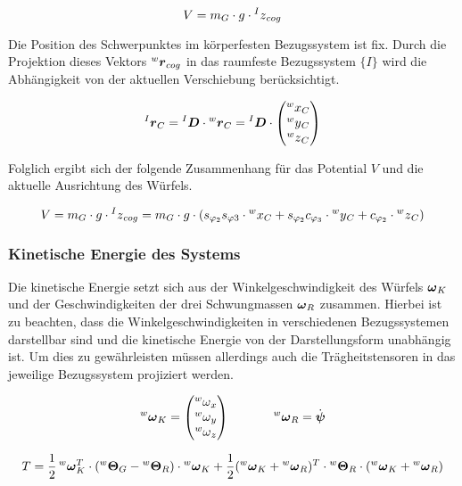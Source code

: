 \begin{equation}
V = m_G \cdot g \cdot \prescript{I}{} z_{cog}
\end{equation}

Die Position des Schwerpunktes im körperfesten Bezugssystem ist fix. Durch die Projektion dieses Vektors $\prescript{w}{}{}\boldsymbol{r}_{cog}$ in das raumfeste Bezugssystem $\{I\}$ wird die Abhängigkeit von der aktuellen Verschiebung berücksichtigt.

\begin{equation}
\prescript{I}{}{}\boldsymbol{r}_C = \prescript{I}{}{}\boldsymbol{D} \cdot \prescript{w}{}{}\boldsymbol{r}_{C} = \prescript{I}{}{}\boldsymbol{D} \cdot \begin{pmatrix}
\prescript{w}{} x_C \\ \prescript{w}{} y_C \\ \prescript{w}{} z_C
\end{pmatrix}
\end{equation}

Folglich ergibt sich der folgende Zusammenhang für das Potential $V$ und die aktuelle Ausrichtung des Würfels.

\begin{equation}
V = m_G \cdot g \cdot \prescript{I}{} z_{cog} = m_G \cdot g \cdot (s_{\varphi_2}s_{\varphi3} \cdot \prescript{w}{} x_C + s_{\varphi_2}c_{\varphi_3} \cdot \prescript{w}{} y_C  + c_{\varphi_2} \cdot \prescript{w}{} z_C)
\end{equation}

\subsubsection{Kinetische Energie des Systems}
Die kinetische Energie setzt sich aus der Winkelgeschwindigkeit des Würfels $\boldsymbol{\omega}_K$ und der Geschwindigkeiten der drei Schwungmassen $\boldsymbol{\omega}_R$ zusammen. Hierbei ist zu beachten, dass die Winkelgeschwindigkeiten in verschiedenen Bezugssystemen darstellbar sind und die kinetische Energie von der Darstellungsform unabhängig ist. Um dies zu gewährleisten müssen allerdings auch die Trägheitstensoren in das jeweilige Bezugssystem projiziert werden.

\begin{equation}
\prescript{w}{}{}\boldsymbol{\omega}_K = \begin{pmatrix}
\prescript{w}{} \omega_x \\
\prescript{w}{} \omega_y \\
\prescript{w}{} \omega_z
\end{pmatrix}
\hspace{35pt}
\prescript{w}{}{}\boldsymbol{\omega}_R = \dot{\boldsymbol{\psi}}
\end{equation}

\begin{equation}
T = \frac{1}{2} \prescript{w}{}{}\boldsymbol{\omega}^T_K \cdot (\prescript{w}{}{}\boldsymbol{\Theta}_G - \prescript{w}{}{}\boldsymbol{\Theta}_R) \cdot \prescript{w}{}{}\boldsymbol{\omega}_K + \frac{1}{2} (\prescript{w}{}{}\boldsymbol{\omega}_K + \prescript{w}{}{}\boldsymbol{\omega}_R)^T \cdot \prescript{w}{}{}\boldsymbol{\Theta}_R \cdot (\prescript{w}{}{}\boldsymbol{\omega}_K + \prescript{w}{}{}\boldsymbol{\omega}_R)
\end{equation}

